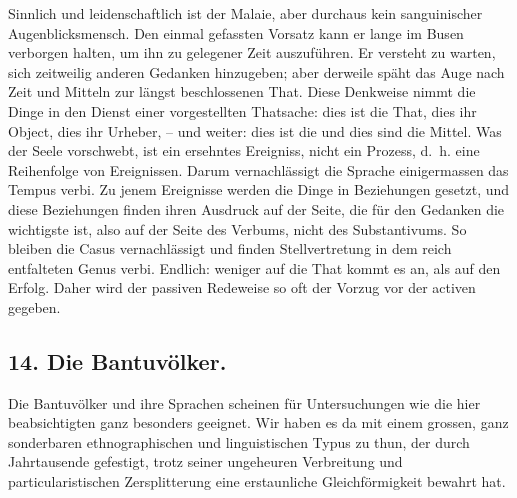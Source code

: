 Sinnlich und leidenschaftlich ist der Malaie, aber durchaus kein sanguinischer Augenblicksmensch. Den einmal gefassten Vorsatz kann er lange im Busen verborgen halten, um ihn zu gelegener Zeit auszuführen. Er versteht zu warten, sich zeitweilig anderen Gedanken hinzugeben; aber derweile späht das Auge nach  Zeit und Mitteln zur längst beschlossenen That. Diese Denkweise nimmt die Dinge in den Dienst einer vorgestellten Thatsache: dies ist die That, dies ihr Object, dies ihr Urheber, – und weiter: dies ist die  und dies sind die Mittel. Was der Seele vorschwebt, ist ein ersehntes Ereigniss, nicht ein Prozess, d.~h. eine Reihenfolge von Ereignissen. Darum vernachlässigt die Sprache einigermassen das Tempus verbi. Zu jenem Ereignisse werden die Dinge in  Beziehungen gesetzt, und diese Beziehungen finden ihren \label{sp.420} Ausdruck auf der Seite, die für den Gedanken die wichtigste ist, also auf der Seite des Verbums, nicht des Substantivums. So bleiben die Casus vernachlässigt und finden Stellvertretung in dem reich entfalteten Genus verbi. Endlich: weniger auf die That \label{fp.399} kommt es an, als auf den Erfolg. Daher wird der passiven Redeweise so oft der Vorzug vor der activen gegeben.

\subsection*{14. Die Bantuvölker.}\label{IV.IV.14}

\begin{styleAnmerk}
\end{styleAnmerk}
Die Bantuvölker und ihre Sprachen scheinen für Untersuchungen wie die hier beabsichtigten ganz besonders geeignet. Wir haben es da mit einem grossen, ganz sonderbaren ethnographischen und linguistischen Typus zu thun, der durch Jahrtausende gefestigt, trotz seiner ungeheuren Verbreitung und particularistischen Zersplitterung eine erstaunliche Gleichförmigkeit bewahrt hat.

